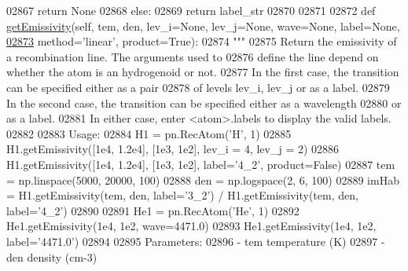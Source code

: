 \begin{DoxyCode}
{{{{{{{{{{{{{{{{{{{{{{02867             \textcolor{keywordflow}{return} \textcolor{keywordtype}{None}
02868         \textcolor{keywordflow}{else}:
02869             \textcolor{keywordflow}{return} label\_str
02870         
02871         
02872     \textcolor{keyword}{def }\hyperlink{classpyneb_1_1core_1_1pynebcore_1_1_rec_atom_ac03957666aff1955387fcc03c6187ad3}{getEmissivity}(self, tem, den, lev\_i=None, lev\_j=None, wave=None, label=None,
\hypertarget{pynebcore_8py_source_l02873}{}\hyperlink{classpyneb_1_1core_1_1pynebcore_1_1_rec_atom_ac03957666aff1955387fcc03c6187ad3}{02873}                       method=\textcolor{stringliteral}{'linear'}, product=\textcolor{keyword}{True}):
02874         \textcolor{stringliteral}{"""}
02875 \textcolor{stringliteral}{        Return the emissivity of a recombination line. The arguments used to }
02876 \textcolor{stringliteral}{        define the line depend on whether the atom is an hydrogenoid or not. }
02877 \textcolor{stringliteral}{        In the first case, the transition can be specified either as a pair }
02878 \textcolor{stringliteral}{        of levels lev\_i, lev\_j or as a label. }
02879 \textcolor{stringliteral}{        In the second case, the transition can be specified either as a wavelength }
02880 \textcolor{stringliteral}{        or as a label.}
02881 \textcolor{stringliteral}{        In either case, enter <atom>.labels to display the valid labels.}
02882 \textcolor{stringliteral}{        }
02883 \textcolor{stringliteral}{        Usage:}
02884 \textcolor{stringliteral}{            H1 = pn.RecAtom('H', 1)}
02885 \textcolor{stringliteral}{            H1.getEmissivity([1e4, 1.2e4], [1e3, 1e2], lev\_i = 4, lev\_j = 2)}
02886 \textcolor{stringliteral}{            H1.getEmissivity([1e4, 1.2e4], [1e3, 1e2], label='4\_2', product=False)}
02887 \textcolor{stringliteral}{            tem = np.linspace(5000, 20000, 100)}
02888 \textcolor{stringliteral}{            den = np.logspace(2, 6, 100)}
02889 \textcolor{stringliteral}{            imHab = H1.getEmissivity(tem, den, label='3\_2') / H1.getEmissivity(tem, den, label='4\_2')}
02890 \textcolor{stringliteral}{}
02891 \textcolor{stringliteral}{            He1 = pn.RecAtom('He', 1)}
02892 \textcolor{stringliteral}{            He1.getEmissivity(1e4, 1e2, wave=4471.0)}
02893 \textcolor{stringliteral}{            He1.getEmissivity(1e4, 1e2, label='4471.0')}
02894 \textcolor{stringliteral}{            }
02895 \textcolor{stringliteral}{        Parameters:}
02896 \textcolor{stringliteral}{            - tem            temperature (K)}
02897 \textcolor{stringliteral}{            - den            density (cm-3)}
}}}}}}}}}}}}}}}}}}}}}}
\end{DoxyCode}
